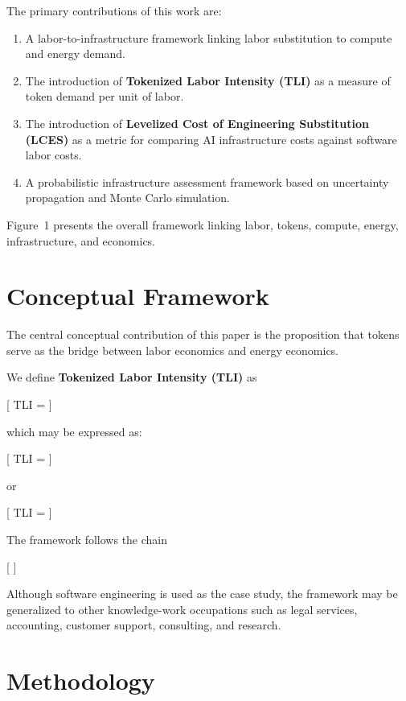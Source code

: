 The primary contributions of this work are:

\begin{enumerate}
\item A labor-to-infrastructure framework linking labor substitution to compute and energy demand.
\item The introduction of \textbf{Tokenized Labor Intensity (TLI)} as a measure of token demand per unit of labor.
\item The introduction of \textbf{Levelized Cost of Engineering Substitution (LCES)} as a metric for comparing AI infrastructure costs against software labor costs.
\item A probabilistic infrastructure assessment framework based on uncertainty propagation and Monte Carlo simulation.
\end{enumerate}

Figure~1 presents the overall framework linking labor, tokens, compute, energy, infrastructure, and economics.

\section{Conceptual Framework}

The central conceptual contribution of this paper is the proposition that tokens serve as the bridge between labor economics and energy economics.

We define \textbf{Tokenized Labor Intensity (TLI)} as

[
TLI =
{}
]

which may be expressed as:

[
TLI =
{}
]

or

[
TLI =
{}
]

The framework follows the chain

[
\rightarrow
{}
\rightarrow
{}
\rightarrow
{}
\rightarrow
{}
\rightarrow
{}
]

Although software engineering is used as the case study, the framework may be generalized to other knowledge-work occupations such as legal services, accounting, customer support, consulting, and research.

\section{Methodology}

